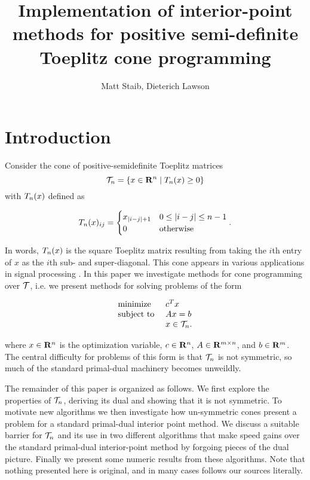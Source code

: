 \documentclass{article}
\title{Implementation of interior-point methods for positive semi-definite Toeplitz cone programming}
\author{Matt Staib, Dieterich Lawson}
\begin{document}
\maketitle
\large
\section{Introduction}
Consider the cone of positive-semidefinite Toeplitz matrices
\[
  \mathcal{T}_n = \{x \in \mathbf{R}^n \mid T_n(x) \geq 0\}
\]
with $T_n(x)$ defined as

\[
  T_n(x)_{ij} = \begin{cases}
      x_{|i-j|+1} &  0 \leq |i-j| \leq n-1 \\
      0 & \mbox{otherwise}
\end{cases}.
\]

In words, $T_n (x)$ is the square Toeplitz matrix resulting from taking the $i$th
entry of $x$ as the $i$th sub- and super-diagonal. This cone appears in various applications
in signal processing . In this paper we investigate methods for cone programming
over $\mathcal{T}$, i.e. we present methods for solving problems of the form

\begin{equation}\label{primal}
  \begin{array}{ll}
    \mbox{minimize}    & c^Tx \\
    \mbox{subject to } & Ax = b \\
                       & x \in \mathcal{T}_n. 
  \end{array}
\end{equation}

where $x\in \mathbf{R}^n$ is the optimization variable, $c \in \mathbf{R}^n$, $A \in \mathbf{R}^{m\times n}$, 
and $b \in \mathbf{R}^m$. The central difficulty for problems of this form is that $\mathcal{T}_n$
is not symmetric, so much of the standard primal-dual machinery becomes unweildly.

The remainder of this paper is organized as follows. We first explore the properties of 
$\mathcal{T}_n$, deriving its dual and showing that it is not symmetric. To motivate
new algorithms we then investigate how un-symmetric cones present a problem for a standard 
primal-dual interior point method. We discuss a suitable barrier for $\mathcal{T}_n$ 
and its use in two different algorithms that make speed gains over the standard primal-dual
interior-point method by forgoing pieces of the dual picture. Finally we present some 
numeric results from these algorithms. Note that nothing presented here is original, and in
many cases follows our sources literally.
\end{document}
